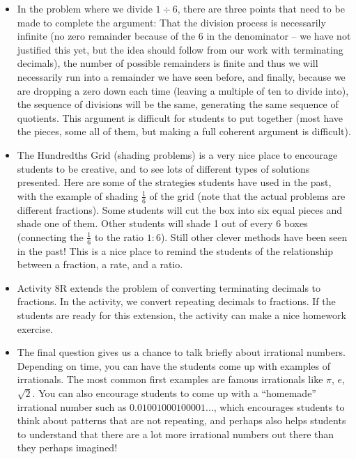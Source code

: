 \documentclass[noauthor, nooutcomes]{ximera}
\begin{document}
\begin{instructorNotes}
\begin{itemize}
  \item In the problem where we divide $1 \div 6$, there are three points that need to be made to complete the argument:  That the division process is necessarily infinite (no zero remainder because of the 6 in the denominator -- we have not justified this yet, but the idea should follow from our work with terminating decimals), the number of possible remainders is finite and thus we will necessarily run into a remainder we have seen before, and finally, because we are dropping a zero down each time (leaving a multiple of ten to divide into), the sequence of divisions will be the same, generating the same sequence of quotients. This argument is difficult for students to put together (most have the  pieces, some all of them, but making a full coherent argument is difficult).
  
  \item The Hundredths Grid (shading problems) is a very nice place to encourage students to be creative, and to see lots of different types of solutions presented. Here are some of the strategies students have used in the past, with the example of shading $\frac16$ of the grid (note that the actual problems are different fractions). Some students will cut the box into six equal pieces and shade one of them. Other students will shade 1 out of every 6 boxes (connecting the $\frac{1}{6}$ to the ratio $1:6$). Still other clever methods have been seen in the past! This is a nice place to remind the students of the relationship between a fraction, a rate, and a ratio.

\item Activity 8R extends the problem of converting terminating decimals to fractions. In the activity, we convert repeating decimals to fractions. If the students are ready for this extension, the activity can make a nice homework exercise.

\item The final question gives us a chance to talk briefly about irrational numbers. Depending on time, you can have the students come up with examples of irrationals. The most common first examples are famous irrationals like $\pi$, $e$, $\sqrt{2}$. You can also encourage students to come up with a ``homemade'' irrational number such as $0.01001000100001\dots$, which encourages students to think about patterns that are not repeating, and perhaps also helps students to understand that there are a lot more irrational numbers out there than they perhaps imagined! 


 \end{itemize}



\end{instructorNotes}
\end{document}
